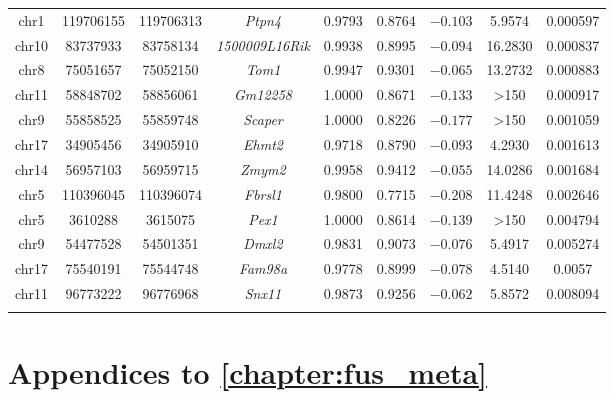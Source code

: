\begin{appendices}
\begin{table}[!htbp]
\begin{tabular}{@{\extracolsep{5pt}} ccccccccc}
	chr1 & 119706155  & 119706313 & \textit{Ptpn4} & 0.9793 & 0.8764 & $-0.103$ & 5.9574 & 0.000597 \\ 
	chr10 & 83737933 & 83758134 & \textit{1500009L16Rik} & 0.9938 & 0.8995 & $-0.094$ & 16.2830 & 0.000837 \\ 
	chr8 & 75051657 & 75052150 & \textit{Tom1} & 0.9947 & 0.9301 & $-0.065$ & 13.2732 & 0.000883 \\ 
	chr11 & 58848702 & 58856061 & \textit{Gm12258} & 1.0000 & 0.8671 & $-0.133$ & \textgreater 150 & 0.000917 \\ 
	chr9 & 55858525 & 55859748 & \textit{Scaper} & 1.0000 & 0.8226 & $-0.177$ & \textgreater 150 & 0.001059 \\ 
	chr17 & 34905456 & 34905910 & \textit{Ehmt2} & 0.9718 & 0.8790 & $-0.093$ & 4.2930 & 0.001613 \\ 
	chr14 & 56957103 & 56959715 & \textit{Zmym2} & 0.9958 & 0.9412 & $-0.055$ & 14.0286 & 0.001684 \\ 
	chr5 & 110396045 & 110396074& \textit{Fbrsl1} & 0.9800 & 0.7715 & $-0.208$ & 11.4248 & 0.002646 \\ 
	chr5 & 3610288 & 3615075 & \textit{Pex1} & 1.0000 & 0.8614 & $-0.139$ & \textgreater 150 & 0.004794 \\ 
	chr9 & 54477528 & 54501351 & \textit{Dmxl2} & 0.9831 & 0.9073 & $-0.076$ & 5.4917 & 0.005274 \\ 
	chr17 & 75540191 & 75544748 & \textit{Fam98a} & 0.9778 & 0.8999 & $-0.078$ & 4.5140 & 0.0057 \\ 
	chr11 & 96773222 & 96776968 & \textit{Snx11} & 0.9873 & 0.9256 & $-0.062$ & 5.8572 & 0.008094 \\ 
	\hline \\[-1.8ex] 
	\end{tabular} 
	\end{table} 
	
\clearpage

\section*{Appendices to \autoref{chapter:fus_meta} }


\end{appendices}

